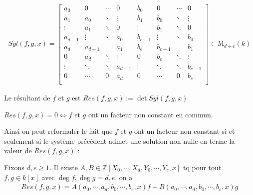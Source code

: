             \begin{align*}
                Syl(f,g,x) =
                \begin{bmatrix}
                    a_0 & 0 & \cdots & 0 & b_0 & 0 & \cdots & 0 \\
                    a_1 & a_0 & \ddots & \vdots & b_1 & b_0 & \ddots & \vdots \\
                    \vdots & a_1 & \ddots & 0 & \vdots & b_1 & \ddots & 0 \\
                    a_{d-1} & \vdots & \ddots & a_0 & b_{e-1} & \vdots & \ddots & b_0 \\
                    a_d & a_{d-1} & & a_1 & b_e & b_{e-1} & & b_1 \\
                    0 & a_d & \ddots & \vdots & 0 & b_e & \ddots & \vdots \\
                    \vdots & \ddots & \ddots & a_{d-1} & \vdots & \ddots & \ddots & b_{e-1} \\
                    0 & \cdots & 0 & a_d & 0 & \cdots & 0 & b_e \\
                \end{bmatrix}
                \in \mathrm{M}_{d+e}(k)
            \end{align*}
            \begin{defi}
                Le résultant de $f$ et $g$ est $Res(f,g,x) := \det Syl(f,g,x)$
            \end{defi}
            \begin{prop}
                $Res(f,g,x) = 0 \iff f$ et $g$ ont un facteur non constant en commun.
            \end{prop}
            Ainsi on peut reformuler le fait que $f$ et $g$ ont un facteur non constant si et seulement si le système précédent admet une solution non nulle en terme la valeur de $Res(f, g, x)$ :
            \begin{prop}
                \label{prop232}
                Fixons $d,e \geq 1$. Il existe $A,B \in \mathbb{Z}[X_0, \cdots, X_d, Y_0, \cdots, Y_e, x]$ tq pour tout $f,g \in k[x]$ avec $\deg f , \deg g = d,e$, on a 
                \begin{align*}
                    Res(f,g,x) = A(a_0, \cdots, a_d, b_0, \cdots, b_e, x) f +  B(a_0, \cdots, a_d, b_0, \cdots, b_e, x) g
                \end{align*}
            \end{prop}
